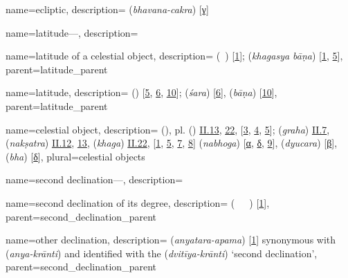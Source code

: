 {
        name={ecliptic},     
        description={ (\textit{bhavana-cakra}) [\hyperlink{SEpassC}{γ}]} 
}

{
        name={latitude---},
        description={\phantom{x}\nopagebreak}
}

{
        name={latitude of a celestial object},
        description={ (\ard\idafaconsonant\ \kawkab) [\hyperlink{PEpass1}{1}];  (\textit{khagasya bāṇa}) [\hyperlink{SEpass1}{1}, \hyperlink{SEpass5}{5}]},
        parent={latitude_parent}
}

{
        name={latitude},
        description={  (\ard) [\hyperlink{PEpass5}{5}, \hyperlink{PEpass6}{6}, \hyperlink{PEpass10}{10}];  (\textit{śara}) [\hyperlink{SEpass6}{6}],  (\textit{bāṇa}) [\hyperlink{SEpass10}{10}]},
        parent={latitude_parent}
}
 
{
        name={celestial object},
        description={ (\kawkab), pl.\thinspace {} (\kawakib)   \hyperlink{Pii13}{II.13}, \hyperlink{Pii22}{22}, [\hyperlink{PEpass3}{3}, \hyperlink{PEpass4}{4}, \hyperlink{PEpass5}{5}];
        (\textit{graha}) \hyperlink{Sii7}{II.7},  (\textit{nakṣatra}) \hyperlink{Sii12}{II.12}, \hyperlink{Sii13}{13},  (\textit{khaga}) \hyperlink{Sii22}{II.22}, [\hyperlink{SEpass1}{1}, \hyperlink{SEpass5}{5}, \hyperlink{SEpass7}{7}, \hyperlink{SEpass8}{8}]  (\textit{nabhoga}) [\hyperlink{SEpassA}{α}, \hyperlink{SEpassD}{δ}, \hyperlink{SEpass9}{9}],  (\textit{dyucara}) [\hyperlink{SEpassB}{β}],  (\textit{bha}) [\hyperlink{SEpassD}{δ}]},
        plural={celestial objects}
}

{
        name={second declination---},
        description={\phantom{x}\nopagebreak}
}

{
        name={second declination of its degree},
        description={ (\mayl\idafaconsonant\ \thani\idafavowel\ \daraji\idafavowel\ \uy) [\hyperlink{PEpass1}{1}]},
        parent={second_declination_parent}
}

{
        name={other declination},
        description={ (\textit{anyatara-apama}) [\hyperlink{SEpass1}{1}]\newline
        synonymous with  (\textit{anya-krānti}) and identified with the  (\textit{dvitīya-krānti}) `second declination'},
        parent={second_declination_parent}
}

